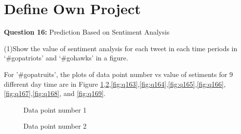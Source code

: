 \documentclass{article}
\begin{document}
\newpage

\section{Define Own Project}
\textbf{Question 16:}
Prediction Based on Sentiment Analysis

(1)Show the value of sentiment analysis for each tweet in each time periods in ‘#gopatriots’ and ‘#gohawks’ in a figure.

For '#gopatruits', the plots of data point number vs value of setiments for 9 different day time are in Figure \ref{fig:q161},\ref{fig:q162},\ref{fig:q163},\ref{fig:q164},\ref{fig:q165},\ref{fig:q166},\ref{fig:q167},\ref{fig:q168}, and \ref{fig:q169}.


\begin{figure}
\centering
{}
\caption{Data point number 1} \label{fig:q161}
\end{figure}

\begin{figure}
\centering
{}
\caption{Data point number 2} \label{fig:q162}
\end{figure}
\end{document}
